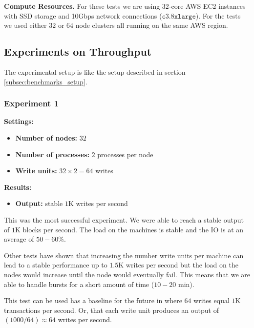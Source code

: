 \medskip
\noindent\textbf{Compute Resources.} For these tests we are using $32$-core AWS EC2 instances with SSD storage and 10Gbps network connections ($\mathtt{c3.8xlarge}$).
For the tests we used either $32$ or $64$ node clusters all running on the same AWS region.

\subsection{Experiments on Throughput}
The experimental setup is like the setup described in section \ref{subsec:benchmarks_setup}. 

\subsubsection{Experiment 1}\label{subsubsec:appendix_benchmarks_exp1}

\medskip
\noindent\textbf{Settings:}
\begin{itemize}
 \item \textbf{Number of nodes:} $32$
 \item \textbf{Number of processes:} $2$ processes per node
 \item \textbf{Write units:} $32 \times 2 = 64$ writes
\end{itemize}

\medskip
\noindent\textbf{Results:}
\begin{itemize}
 \item \textbf{Output:} stable $1$K writes per second
\end{itemize}

This was the most successful experiment. We were able to reach a stable output of $1$K blocks per second. The load on the machines is stable and the IO is at an average of $50-60 \%$.

Other tests have shown that increasing the number write units per machine can lead to a stable performance up to $1.5$K writes per second but the load on the nodes would increase until the node would eventually fail. 
This means that we are able to handle bursts for a short amount of time ($10-20$ min).

This test can be used has a baseline for the future in where $64$ writes equal $1$K transactions per second. 
Or, that each write unit produces an output of $(1000/64) \approx 64$ writes per second.

